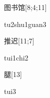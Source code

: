 \begin{verbete}{图书馆}[8;4;11]
\begin{pronuncia}{tu2shu1guan3}
\end{pronuncia}
\end{verbete}

\begin{verbete}{推迟}[11;7]
\begin{pronuncia}{tui1chi2}
\end{pronuncia}
\end{verbete}

\begin{verbete}[tui3]{腿}[13]
\begin{pronuncia}{tui3}
\end{pronuncia}
\end{verbete}

